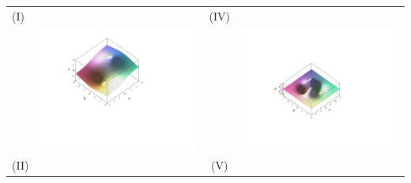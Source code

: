 \documentclass[12pt]{article}
\begin{document}
\begin{enumerate}
\begin{center}
\begin{tabular}{lc|cc}
(I)&&(IV)\\
&\includegraphics[scale=0.45]{matchinge.pdf} &\hspace{0.5 cm}& \includegraphics[scale=0.5]{matchingb.pdf}\\
(II)&&(V)\\

\end{tabular}
\end{center}
\end{enumerate}
\end{document}
